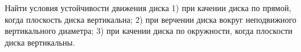 Найти условия устойчивости движения диска
1) при качении диска по прямой, когда плоскость диска вертикальна;
2) при верчении диска вокруг неподвижного вертикального диаметра;
3) при качении диска по окружности, когда плоскости диска вертикальны.
